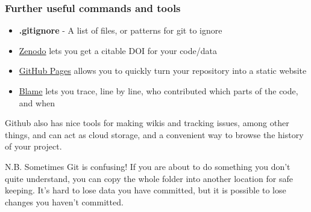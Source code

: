 \documentclass{beamer}
\newcommand{\code}[1]{{\fontfamily{pcr}\selectfont \textbf{#1}}}
\begin{document}
\begin{frame}


\end{frame}

\begin{frame}
\frametitle{Further useful commands and tools}

\begin{itemize}
	\item \code{.gitignore} - A list of files, or patterns for git to ignore
	\item \href{https://guides.github.com/activities/citable-code/}{Zenodo} lets you get a citable DOI for your code/data
	\item \href{https://guides.github.com/features/pages/}{GitHub Pages} allows you to quickly turn your repository into a static website
	\item \href{https://github.com/mcc-apsis/git-intro/blame/master/slides/presentation.tex}{Blame} lets you trace, line by line, who contributed which parts of the code, and when
	
\end{itemize}

Github also has nice tools for making wikis and tracking issues, among other things, and can act as cloud storage, and a convenient way to browse the history of your project.

\bigskip

N.B. Sometimes Git is confusing! If you are about to do something you don't quite understand, you can copy the whole folder into another location for safe keeping. It's hard to lose data you have committed, but it is possible to lose changes you haven't committed.




\end{frame}
\end{document}
